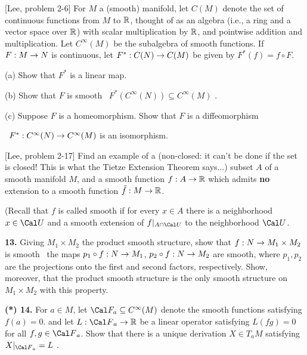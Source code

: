 \bsk

 [Lee, problem 2-6] For $M$ a (smooth) manifold, let $C(M)$ denote the
set of continuous functions from $M$ to ${\Bbb R}$, thought of as an algebra (i.e., a ring and a vector
space over ${\Bbb R}$) with scalar multiplication by ${\Bbb R}$, and pointwise addition and multiplication.
Let $C^\infty(M)$ be the subalgebra of smooth functions. If $F:M\rightarrow N$ is continuous,
let $F^*:C(N)\rightarrow C(M)$ be given by $F^*(f)=f\circ F$.

\ssk

(a) Show that $F^*$ is a linear map.

\ssk

(b) Show that $F$ is smooth \lra\ $F^*(C^\infty(N))\subseteq C^\infty(M)$ .

\ssk

(c) Suppose $F$ is a homeomorphism. Show that $F$ is a diffeomorphism

\noindent \lra\ $F^*:C^\infty(N)\rightarrow C^\infty(M)$ is an isomorphism.

\bsk

 [Lee, problem 2-17] Find an example of a (non-closed: it can't be done if the set is
closed! This is what the Tietze Extension Theorem says...) subset $A$ of a smooth manifold $M$, 
and a smooth function $f:A\rightarrow {\Bbb R}$ which admits
{\bf no} extension to a smooth function $\tilde{f}:M\rightarrow {\Bbb R}$.

\ssk

(Recall that $f$ is called smooth if for every $x\in A$ there is a neighborhood $x\in{\Cal U}$ and a smooth
extension of $f|_{A\cap {\Cal U}}$ to the neighborhood ${\Cal U}$.

\bsk

\item{\bf 13.} Giving $M_1\times M_2$ the product smooth structure, show that $f:N\rightarrow M_1\times M_2$
is smooth \lra\ the maps $p_1\circ f:N\rightarrow M_1$, $p_2\circ f:N\rightarrow M_2$ are smooth, where
$p_1,p_2$ are the projections onto the first and second factors, respectively. Show, moreover, that
the product smooth structure is the only smooth structure on $M_1\times M_2$ with this property.

\bsk

\item{\bf (*) 14.} For $a\in M$, let ${\Cal F_a}\subseteq C^\infty(M)$ denote the smooth 
functions satisfying $f(a)=0$. and let $L:{\Cal F}_a\ra \bbr$ be a linear operator
satisfying $L(fg)=0$ for all $f,g\in {\Cal F}_a$. Show that there is a unique
derivation $X\in T_aM$ satisfying $X|_{{\Cal F}_a}=L$ .

